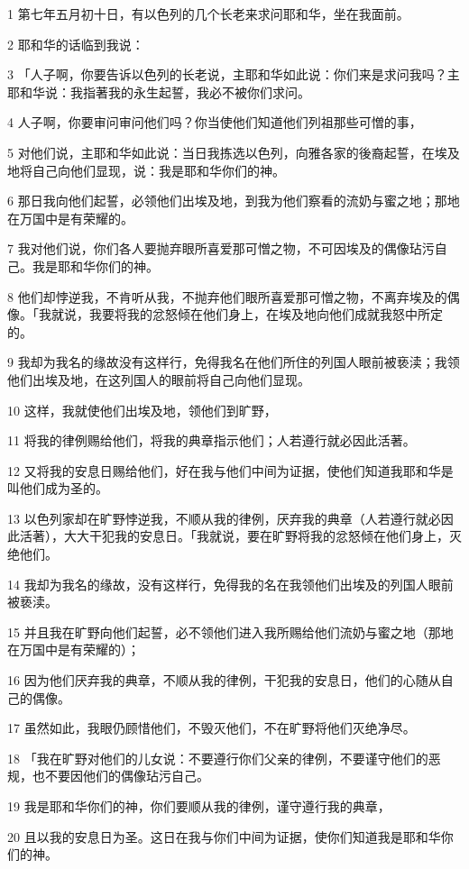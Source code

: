 \par 1 第七年五月初十日，有以色列的几个长老来求问耶和华，坐在我面前。
\par 2 耶和华的话临到我说：
\par 3 「人子啊，你要告诉以色列的长老说，主耶和华如此说：你们来是求问我吗？主耶和华说：我指著我的永生起誓，我必不被你们求问。
\par 4 人子啊，你要审问审问他们吗？你当使他们知道他们列祖那些可憎的事，
\par 5 对他们说，主耶和华如此说：当日我拣选以色列，向雅各家的後裔起誓，在埃及地将自己向他们显现，说：我是耶和华你们的神。
\par 6 那日我向他们起誓，必领他们出埃及地，到我为他们察看的流奶与蜜之地；那地在万国中是有荣耀的。
\par 7 我对他们说，你们各人要抛弃眼所喜爱那可憎之物，不可因埃及的偶像玷污自己。我是耶和华你们的神。
\par 8 他们却悖逆我，不肯听从我，不抛弃他们眼所喜爱那可憎之物，不离弃埃及的偶像。「我就说，我要将我的忿怒倾在他们身上，在埃及地向他们成就我怒中所定的。
\par 9 我却为我名的缘故没有这样行，免得我名在他们所住的列国人眼前被亵渎；我领他们出埃及地，在这列国人的眼前将自己向他们显现。
\par 10 这样，我就使他们出埃及地，领他们到旷野，
\par 11 将我的律例赐给他们，将我的典章指示他们；人若遵行就必因此活著。
\par 12 又将我的安息日赐给他们，好在我与他们中间为证据，使他们知道我耶和华是叫他们成为圣的。
\par 13 以色列家却在旷野悖逆我，不顺从我的律例，厌弃我的典章（人若遵行就必因此活著），大大干犯我的安息日。「我就说，要在旷野将我的忿怒倾在他们身上，灭绝他们。
\par 14 我却为我名的缘故，没有这样行，免得我的名在我领他们出埃及的列国人眼前被亵渎。
\par 15 并且我在旷野向他们起誓，必不领他们进入我所赐给他们流奶与蜜之地（那地在万国中是有荣耀的）；
\par 16 因为他们厌弃我的典章，不顺从我的律例，干犯我的安息日，他们的心随从自己的偶像。
\par 17 虽然如此，我眼仍顾惜他们，不毁灭他们，不在旷野将他们灭绝净尽。
\par 18 「我在旷野对他们的儿女说：不要遵行你们父亲的律例，不要谨守他们的恶规，也不要因他们的偶像玷污自己。
\par 19 我是耶和华你们的神，你们要顺从我的律例，谨守遵行我的典章，
\par 20 且以我的安息日为圣。这日在我与你们中间为证据，使你们知道我是耶和华你们的神。
